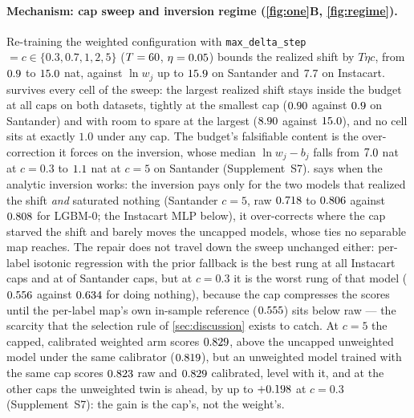 \documentclass[sigconf,nonacm]{acmart}
\newcommand{\Nm}{\textsf{LGBM-0}\xspace}
\newcommand{\Supp}[1]{Supplement~#1}  %
\begin{document}
\paragraph{Mechanism: cap sweep and inversion regime (\cref{fig:one}B, \cref{fig:regime}).} Re-training the weighted configuration with \texttt{max\_delta\_step}$=c\in\{0.3,0.7,1,2,5\}$ ($T=60$, $\eta=0.05$) bounds the realized shift by $T\eta c$, from $0.9$ to $15.0$ nat, against $\ln w_j$ up to $15.9$ on Santander and $7.7$ on Instacart.  survives every cell of the sweep: the largest realized shift stays inside the budget at all \ncapN{} caps on both datasets, tightly at the smallest cap ($0.90$ against $0.9$ on Santander) and with room to spare at the largest ($8.90$ against $15.0$), and no cell sits at exactly $1.0$ under any cap. The budget's falsifiable content is the over-correction it forces on the inversion, whose median $\ln w_j-b_j$ falls from $7.0$ nat at $c=0.3$ to $1.1$ nat at $c=5$ on Santander (\Supp{S7}).  says when the analytic inversion works: the inversion pays only for the two models that realized the shift \emph{and} saturated nothing (Santander $c=5$, raw $0.718$ to $0.806$ against $0.808$ for \Nm; the Instacart MLP below), it over-corrects where the cap starved the shift and barely moves the uncapped models, whose ties no separable map reaches. The repair does not travel down the sweep unchanged either: per-label isotonic regression with the prior fallback is the best rung at all \nInCapsIsoBest{} Instacart caps and at \nnCapsIsoBest{} of \nnCapsRungs{} Santander caps, but at $c=0.3$ it is the worst rung of that model ($0.556$ against $0.634$ for doing nothing), because the cap compresses the scores until the per-label map's own in-sample reference ($0.555$) sits below raw --- the scarcity that the selection rule of \cref{sec:discussion} exists to catch. At $c=5$ the capped, calibrated weighted arm scores $0.829$, above the uncapped unweighted model under the same calibrator ($0.819$), but an unweighted model trained with the same cap scores $0.823$ raw and $0.829$ calibrated, level with it, and at the other \ncapNtwinsAhead{} caps the unweighted twin is ahead, by up to $+0.198$ at $c=0.3$ (\Supp{S7}): the gain is the cap's, not the weight's.
\end{document}
